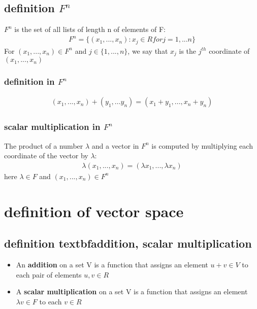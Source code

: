 \documentclass[a4paper,12pt]{article}
\begin{document}
\subsection{definition $F^n$}
$F^n$ is the set of all lists of length n of elements of F:
\begin{align*}
    F^n = \{(x_1,...,x_n):x_j \in R for j = 1,...n\}
\end{align*}
For $(x_1,...,x_n) \in F^n$ and $j \in \{1,...,n\}$, we say that $x_j$ is the $j^{th}$ coordinate of $(x_1,...,x_n)$ 
    \subsubsection{definition in $F^n$}
        \begin{align*}
            (x_1,...,x_n) + (y_1,...y_n) = (x_1 + y_1,...,x_n + y_n)
        \end{align*}
    \subsubsection{scalar multiplication in $F^n$}
    The product of a number $\lambda$ and  a vector in $F^n$ is computed by multiplying each coordinate of the vector by $\lambda$:
        \begin{align*}
            \lambda(x_1,...,x_n) = (\lambda x_1,...,\lambda x_n)
        \end{align*}
    here $\lambda \in F$ and $(x_1,...,x_n) \in F^n$

\section{definition of vector space}
\subsection{definition textbf{addition, scalar multiplication}}
\begin{itemize}
    \item An \textbf{addition} on a set V is a function that assigns an element $u + v \in V$ to each pair of elements $u ,v \in R$
    \item A \textbf{scalar multiplication} on a set V is a function that assigns an element $\lambda v \in F$ to each $v \in R$
 \end{itemize}
\end{document}
